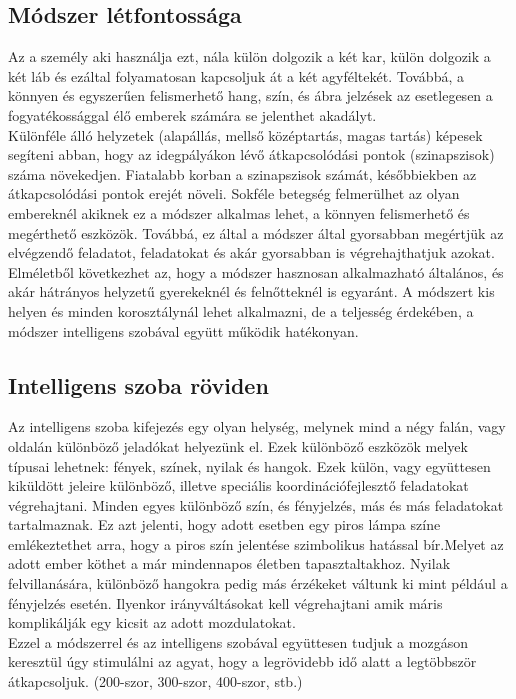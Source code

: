 \documentclass[tocnopagenum]{thesis-ekf}
\theoremstyle{definition}
\theoremstyle{remark}
\begin{document}
	\subsection{Módszer létfontossága}
	Az a személy aki használja ezt, nála külön dolgozik a két kar, külön dolgozik a két láb és ezáltal folyamatosan kapcsoljuk át a két agyféltekét.
	Továbbá, a könnyen és egyszerűen felismerhető hang, szín, és ábra jelzések az esetlegesen a fogyatékossággal élő emberek számára se jelenthet akadályt.
	\\
	Különféle álló helyzetek (alapállás, mellső középtartás, magas tartás) képesek segíteni abban, hogy az idegpályákon lévő átkapcsolódási pontok (szinapszisok) száma növekedjen. Fiatalabb korban a szinapszisok számát, későbbiekben az átkapcsolódási pontok erejét növeli.
	Sokféle betegség felmerülhet az olyan embereknél akiknek ez a módszer alkalmas lehet, a könnyen felismerhető és megérthető eszközök.
	Továbbá, ez által a módszer által gyorsabban megértjük az elvégzendő  feladatot, feladatokat és akár gyorsabban is végrehajthatjuk azokat.
	 \\
	Elméletből következhet az, hogy a módszer hasznosan alkalmazható általános, és akár hátrányos helyzetű gyerekeknél és felnőtteknél is egyaránt.
	A módszert kis helyen és minden korosztálynál lehet alkalmazni, de a teljesség érdekében, a módszer intelligens szobával együtt működik hatékonyan.
	
	
	\subsection{Intelligens szoba röviden}
	Az intelligens szoba kifejezés egy olyan helység, melynek mind a négy falán, vagy oldalán különböző jeladókat helyezünk el.
	Ezek különböző eszközök melyek típusai lehetnek: fények, színek, nyilak és hangok. Ezek külön, vagy együttesen kiküldött jeleire különböző, illetve speciális koordinációfejlesztő feladatokat végrehajtani. Minden egyes különböző szín, és fényjelzés, más és más feladatokat tartalmaznak.
	Ez azt jelenti, hogy adott esetben egy piros lámpa színe emlékeztethet arra, hogy a piros szín jelentése szimbolikus hatással bír.Melyet az adott ember köthet a már mindennapos életben tapasztaltakhoz. Nyilak felvillanására, különböző hangokra pedig más érzékeket váltunk ki mint például a fényjelzés esetén. Ilyenkor irányváltásokat kell végrehajtani amik máris komplikálják egy kicsit az adott mozdulatokat.
	\\
	Ezzel a módszerrel és az intelligens szobával együttesen tudjuk a mozgáson keresztül úgy stimulálni az agyat, hogy a legrövidebb idő alatt a legtöbbször átkapcsoljuk. (200-szor, 300-szor, 400-szor, stb.)
	\par
\end{document}
